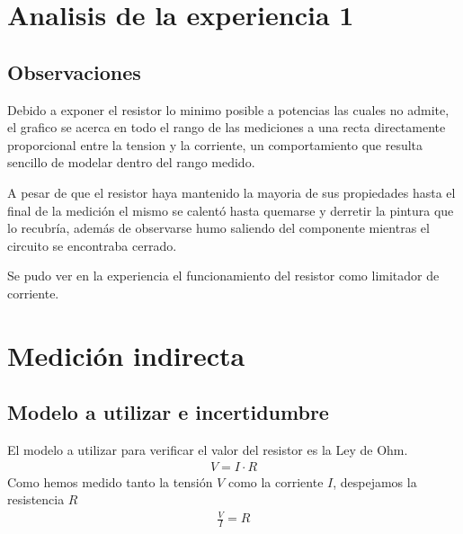 \documentclass[12pt]{article}
\begin{document}
\section{Analisis de la experiencia 1}
\subsection{Observaciones}
Debido a exponer el resistor lo minimo posible a potencias las cuales no admite, el grafico se acerca en todo el rango de las mediciones a una recta directamente proporcional entre la tension y la corriente,
un comportamiento que resulta sencillo de modelar dentro del rango medido.

A pesar de que el resistor haya mantenido la mayoria de sus propiedades hasta el final de la medición
el mismo se calentó hasta quemarse y derretir la pintura que lo recubría, además de observarse humo saliendo del componente mientras el circuito se encontraba cerrado.

Se pudo ver en la experiencia el funcionamiento del resistor como limitador de corriente.
\section{Medición indirecta}
\subsection{Modelo a utilizar e incertidumbre}
El modelo a utilizar para verificar el valor del resistor es la Ley de Ohm.
\begin{align}
    V=I \cdot R
\end{align}
Como hemos medido tanto la tensión $V$ como la corriente $I$, despejamos la resistencia $R$
\begin{align}
    \frac{V}{I}=R
\end{align}
\end{document}
